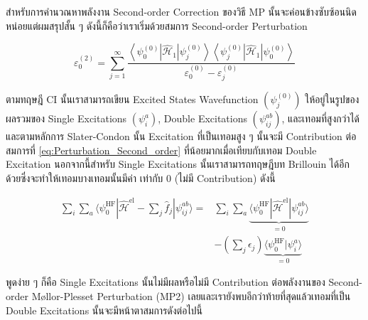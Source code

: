 สำหรับการคำนวณหาพลังงาน Second-order Correction ของวิธี MP นั้นจะค่อนข้างซับซ้อนนิดหน่อยแต่ผมสรุปสั้น ๆ ดังนี้ก็คือว่าเราเริ่มด้วยสมการ
Second-order Perturbation

\begin{equation}
    \label{eq:Perturbation_Second_order}
    \varepsilon_{0}^{(2)}
    =
    \sum_{j=1}^{\infty}
    \frac
    {
        \left\langle
        \psi_{0}^{(0)} \left|\hat{\mathscr{H}}_{1}\right| \psi_{j}^{(0)}
        \right\rangle
        \left\langle
        \psi_{j}^{(0)} \left|\hat{\mathscr{H}}_{1}\right| \psi_{0}^{(0)}
        \right\rangle
    }
    {
        \varepsilon_{0}^{(0)}-\varepsilon_{j}^{(0)}
    }
\end{equation}

\noindent ตามทฤษฎี CI นั้นเราสามารถเขียน Excited States Wavefunction $(\psi_{j}^{(0)})$ ให้อยู่ในรูปของผลรวมของ Single
Excitations $(\psi_{i}^{a})$, Double Excitations $(\psi_{i j}^{a b})$, และเทอมที่สูงกว่าได้ และตามหลักการ Slater-Condon
นั้น Excitation ที่เป็นเทอมสูง ๆ นั้นจะมี Contribution ต่อสมการที่ \ref{eq:Perturbation_Second_order} ที่น้อยมากเมื่อเทียบกับเทอม
Double Excitation นอกจากนี้สำหรับ Single Excitations นั้นเราสามารถทฤษฎีบท Brillouin ได้อีกด้วยซึ่งจะทำให้เทอมบางเทอมนั้นมีค่า%
เท่ากับ 0 (ไม่มี Contribution) ดังนี้

\begin{equation}
    \begin{aligned}
        \sum_{i} \sum_{a}
        \langle\psi_{0}^{\mathrm{HF}} | \hat{\mathscr{H}}^{\mathrm{el}}
        - \sum_{j} \hat{f}_{j} | \psi_{i j}^{a b}\rangle
        = & \sum_{i} \sum_{a}
        \underbrace{\langle\psi_{0}^{\mathrm{HF}}
        | \hat{\mathscr{H}}^{\mathrm{el}} |
        \psi_{i j}^{a b}\rangle}_
        {= 0}                                      \\
          & - \left( \sum_{j} \epsilon_{j} \right)
        \underbrace{\langle\psi_{0}^{\mathrm{HF}} | \psi_{i}^{a} \rangle}_{= 0}
    \end{aligned}
\end{equation}

\noindent พูดง่าย ๆ ก็คือ Single Excitations นั้นไม่มีผลหรือไม่มี Contribution ต่อพลังงานของ Second-order M\o{}llor-Plesset
Perturbation (MP2) เลยและเรายังพบอีกว่าท้ายที่สุดแล้วเทอมที่เป็น Double Excitations นั้นจะมีหน้าตาสมการดังต่อไปนี้

